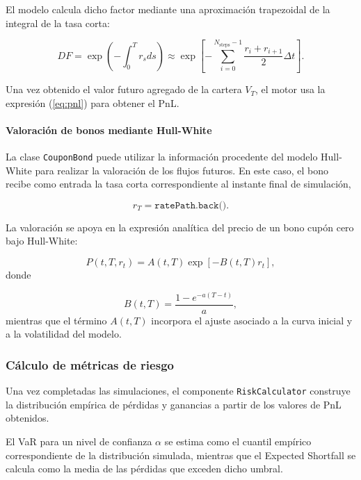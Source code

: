 \documentclass[11pt]{article}
\begin{document}
El modelo calcula dicho factor mediante una aproximación trapezoidal de la integral de la tasa corta:

\begin{equation}
DF=
\exp
\left(
-\int_0^T r_s ds
\right)
\approx
\exp
\left[
-\sum_{i=0}^{N_{\mathrm{steps}}-1}
\frac{r_i+r_{i+1}}{2}
\Delta t
\right].
\label{eq:discount_factor_hw}
\end{equation}

Una vez obtenido el valor futuro agregado de la cartera $V_T$, el motor usa la expresión (\ref{eq:pnl}) para obtener el PnL.

\paragraph{Valoración de bonos mediante Hull-White}

La clase \texttt{CouponBond} puede utilizar la información procedente del modelo Hull-White para realizar la valoración de los flujos futuros. En este caso, el bono recibe como entrada la tasa corta correspondiente al instante final de simulación,

$$
r_T = \texttt{ratePath.back()}.
$$

La valoración se apoya en la expresión analítica del precio de un bono cupón cero bajo Hull-White:

\begin{equation}
P(t,T,r_t)=
A(t,T)
\exp
\left[
-B(t,T)r_t
\right],
\label{eq:hw_zcb}
\end{equation}
donde

\begin{equation}
B(t,T)=
\frac{1-e^{-a(T-t)}}{a},
\end{equation}
mientras que el término $A(t,T)$ incorpora el ajuste asociado a la curva inicial y a la volatilidad del modelo.

\subsubsection{Cálculo de métricas de riesgo}

Una vez completadas las simulaciones, el componente \texttt{RiskCalculator} construye la distribución empírica de pérdidas y ganancias a partir de los valores de PnL obtenidos.

El VaR para un nivel de confianza $\alpha$ se estima como el cuantil empírico correspondiente de la distribución simulada, mientras que el Expected Shortfall se calcula como la media de las pérdidas que exceden dicho umbral.
\end{document}
